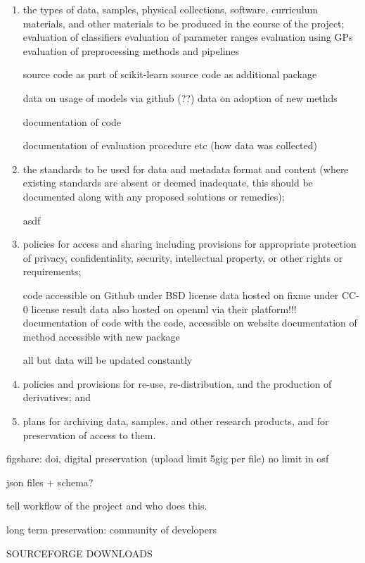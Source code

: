 \begin{enumerate}
\item the types of data, samples, physical collections, software, curriculum
    materials, and other materials to be produced in the course of the project;
evaluation of classifiers
evaluation of parameter ranges
evaluation using GPs
evaluation of preprocessing methods and pipelines

source code as part of scikit-learn
source code as additional package

data on usage of models via github (??)
data on adoption of new methds


documentation of code

documentation of evaluation procedure etc (how data was collected)

\item the standards to be used for data and metadata format and content (where
    existing standards are absent or deemed inadequate, this should be
    documented along with any proposed solutions or remedies);

asdf

\item policies for access and sharing including provisions for appropriate
    protection of privacy, confidentiality, security, intellectual property, or
    other rights or requirements;

code accessible on Github under BSD license
data hosted on fixme under CC-0 license
result data also hosted on openml via their platform!!!
documentation of code with the code, accessible on website
documentation of method accessible with new package


all but data will be updated constantly

\item policies and provisions for re-use, re-distribution, and the production
    of derivatives; and

\item plans for archiving data, samples, and other research products, and for
    preservation of access to them.

\end{enumerate}

%




figshare: doi, digital preservation (upload limit 5gig per file)
no limit in osf

json files + schema?

tell workflow of the project
and who does this.\ 

long term preservation: community of developers

SOURCEFORGE DOWNLOADS
